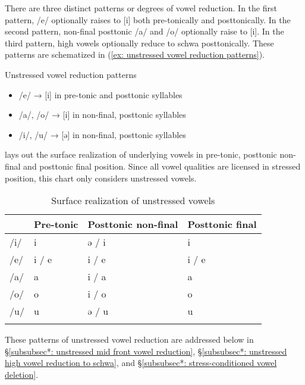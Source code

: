 There are three distinct patterns or degrees of vowel reduction. In the first pattern, /e/ optionally raises to [i] both pre-tonically and posttonically. In the second pattern, non-final posttonic /a/ and /o/ optionally raise to [i].  In the third pattern, high vowels optionally reduce to schwa posttonically. These patterns are schematized in (\ref{ex: unstressed vowel reduction patterns}).

\ea\label{ex: unstressed vowel reduction patterns}
{Unstressed vowel reduction patterns}

   \begin{itemize}
       \item    /e/     →   [i] in pre-tonic and posttonic syllables \\
       \item    /a/, /o/   →   [i] in non-final, posttonic syllables \\
       \item    /i/, /u/    →   [ə] in non-final, posttonic syllables \\
   \end{itemize}
\z

 lays out the surface realization of underlying vowels in pre-tonic, posttonic non-final and posttonic final position. Since all vowel qualities are licensed in stressed position, this chart only considers unstressed vowels.


\begin{table}
\caption{Surface realization of unstressed vowels}
\label{tab:unstressed-vowels}

\begin{tabularx}{\textwidth}{XXll}
\lsptoprule
& \textbf{Pre-tonic}  & \textbf{Posttonic non-final}  & \textbf{Posttonic final}\\
  \midrule
  /i/ & i & ə / i & i\\
  /e/ & i / e & i / e & i / e\\
  /a/ & a & i / a & a\\
  /o/ & o & i / o & o\\
  /u/ & u & ə / u & u\\
 \lspbottomrule
\end{tabularx}
\end{table}

These patterns of unstressed vowel reduction are addressed below in §\ref{subsubsec*: unstressed mid front vowel reduction}, §\ref{subsubsec*: unstressed high vowel reduction to schwa}, and §\ref{subsubsec*: stress-conditioned vowel deletion}.

